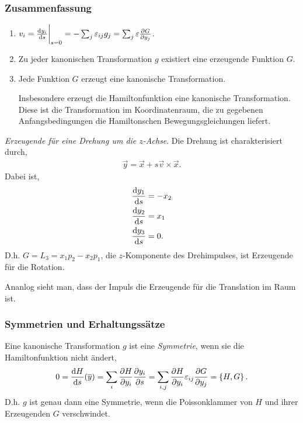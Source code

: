 \subsubsection{Zusammenfassung}

\begin{enumerate}[label=\arabic{*}.)]
  \item $v_i = \frac{\mathrm{d} y_i}{\,\mathrm{d} s\,}\bigg|_{s=0} = -\sum_j \varepsilon_{ij}g_j =
  \sum_j \varepsilon \frac{\partial G}{\partial y_j}$.
  \item Zu jeder kanonischen Transformation $g$ existiert eine erzeugende
  Funktion $G$.
  \item Jede Funktion $G$ erzeugt eine kanonische Transformation.

Insbesondere erzeugt die Hamiltonfunktion eine kanonische Transformation. Diese
ist die Transformation im Koordinatenraum, die zu gegebenen Anfangsbedingungen
die Hamiltonschen Bewegungsgleichungen liefert.
\end{enumerate}

\begin{bsp}
\textit{Erzeugende für eine Drehung um die $z$-Achse}. Die Drehung ist
charakterisiert durch,
\begin{align*}
\vec{y} = \vec{x} + s\vec{v}\times\vec{x}.
\end{align*}
Dabei ist,
\begin{align*}
&\frac{\mathrm{d} y_1}{\,\mathrm{d} s\,} = -x_2\\
&\frac{\mathrm{d} y_2}{\,\mathrm{d} s\,} = x_1\\
&\frac{\mathrm{d} y_3}{\,\mathrm{d} s\,} = 0.
\end{align*}
D.h. $G=L_3 = x_1p_2 - x_2p_1$, die $z$-Komponente des Drehimpulses, ist
Erzeugende für die Rotation.

Ananlog sieht man, dass der Impuls die Erzeugende für die Translation im Raum
ist.\bsphere
\end{bsp}

\subsubsection{Symmetrien und Erhaltungssätze}

Eine kanonische Transformation $g$ ist eine \emph{Symmetrie}, wenn sie die
Hamiltonfunktion nicht ändert,
\begin{align*}
0 = \frac{\mathrm{d} H}{\,\mathrm{d} s\,}(\overline{y}) = \sum_i \frac{\partial H}{\partial
y_i}\frac{\partial y_i}{\partial s} =
\sum_{i,j} \frac{\partial H}{\partial y_i}\varepsilon_{ij}\frac{\partial
G}{\partial y_j} = \left\{ H,G \right\}.
\end{align*}
D.h. $g$ ist genau dann eine Symmetrie, wenn die Poissonklammer von $H$ und
ihrer Erzeugenden $G$ verschwindet.

